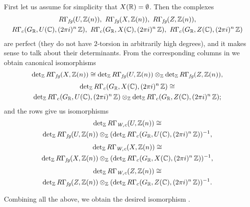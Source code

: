 \begin{nameless}
  First let us assume for simplicity that $X (\mathbb{R}) = \emptyset$. Then the
  complexes
  \begin{gather*}
    R\Gamma_\text{\it fg} (U, \mathbb{Z} (n)), ~
    R\Gamma_\text{\it fg} (X, \mathbb{Z} (n)), ~
    R\Gamma_\text{\it fg} (Z, \mathbb{Z} (n)),\\
    R\Gamma_c (G_{\mathbb{R}}, U (\mathbb{C}), (2\pi i)^n\,\mathbb{Z}), ~
    R\Gamma_c (G_{\mathbb{R}}, X (\mathbb{C}), (2\pi i)^n\,\mathbb{Z}), ~
    R\Gamma_c (G_{\mathbb{R}}, Z (\mathbb{C}), (2\pi i)^n\,\mathbb{Z})
  \end{gather*}
  are perfect (they do not have $2$-torsion in arbitrarily high degrees), and it
  makes sense to talk about their determinants. From the corresponding columns
  in  we obtain canonical
  isomorphisms
  \[ \det\nolimits_{\mathbb{Z}} R\Gamma_\text{\it fg} (X, \mathbb{Z} (n)) \cong
    \det\nolimits_{\mathbb{Z}} R\Gamma_\text{\it fg} (U, \mathbb{Z} (n))
    \otimes_{\mathbb{Z}}
    \det\nolimits_{\mathbb{Z}} R\Gamma_\text{\it fg} (Z, \mathbb{Z} (n)), \]
  \begin{multline*}
    \det\nolimits_{\mathbb{Z}} R\Gamma_c (G_{\mathbb{R}}, X (\mathbb{C}), (2\pi i)^n\,\mathbb{Z}) \cong \\
    \det\nolimits_{\mathbb{Z}} R\Gamma_c (G_{\mathbb{R}}, U (\mathbb{C}), (2\pi i)^n\,\mathbb{Z})
    \otimes_{\mathbb{Z}}
    \det\nolimits_{\mathbb{Z}} R\Gamma_c (G_{\mathbb{R}}, Z (\mathbb{C}), (2\pi i)^n\,\mathbb{Z});
  \end{multline*}
  and the rows give us isomorphisms
  \begin{multline*}
    \det\nolimits_{\mathbb{Z}} R\Gamma_\text{\it W,c} (U, \mathbb{Z} (n)) \cong\\
    \det\nolimits_{\mathbb{Z}} R\Gamma_\text{\it fg} (U, \mathbb{Z} (n))
    \otimes_{\mathbb{Z}}
    (\det\nolimits_{\mathbb{Z}} R\Gamma_c (G_{\mathbb{R}}, U (\mathbb{C}), (2\pi i)^n\,\mathbb{Z}))^{-1},
  \end{multline*}
  \begin{multline*}
    \det\nolimits_{\mathbb{Z}} R\Gamma_\text{\it W,c} (X, \mathbb{Z} (n)) \cong\\
    \det\nolimits_{\mathbb{Z}} R\Gamma_\text{\it fg} (X, \mathbb{Z} (n))
    \otimes_{\mathbb{Z}}
    (\det\nolimits_{\mathbb{Z}} R\Gamma_c (G_{\mathbb{R}}, X (\mathbb{C}), (2\pi i)^n\,\mathbb{Z}))^{-1},
  \end{multline*}
  \begin{multline*}
    \det\nolimits_{\mathbb{Z}} R\Gamma_\text{\it W,c} (Z, \mathbb{Z} (n)) \cong \\
    \det\nolimits_{\mathbb{Z}} R\Gamma_\text{\it fg} (Z, \mathbb{Z} (n))
    \otimes_{\mathbb{Z}}
    (\det\nolimits_{\mathbb{Z}} R\Gamma_c (G_{\mathbb{R}}, Z (\mathbb{C}), (2\pi i)^n\,\mathbb{Z}))^{-1}.
  \end{multline*}

  Combining all the above, we obtain the desired isomorphism
  .
\end{nameless}

